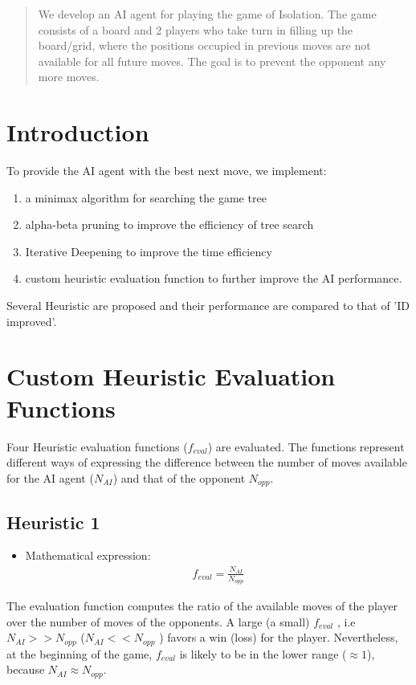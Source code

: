 \documentclass[12pt]{article}
\begin{document}
\maketitle

\begin{abstract}

We develop an AI agent for playing the game of Isolation. The game consists of a board and 2 players who take turn in filling up the board/grid, where the positions occupied in previous moves are not available for all future moves. The goal is to prevent the opponent any more moves.

\end{abstract}

\section{Introduction}
To provide the AI agent with the best next move, we implement:
\begin{enumerate}
\item a minimax algorithm for searching the game tree
\item alpha-beta pruning to improve the efficiency of tree search
\item Iterative Deepening to improve the time efficiency
\item custom heuristic evaluation function to further improve the AI performance.
\end{enumerate}
Several Heuristic are proposed and their performance are compared to that of 'ID improved'.

\section{Custom Heuristic Evaluation Functions}
Four Heuristic evaluation functions ($f_{eval}$) are evaluated. The functions represent different ways of expressing the difference between the number of moves available for the AI agent ($N_{AI}$) and that of the opponent $N_{opp}$. 

\subsection{Heuristic 1}

\begin{itemize}
\item Mathematical expression:
\begin{align}
f_{eval} = \frac{N_{AI}}{N_{opp}}
\end{align}
\end{itemize}
The evaluation function computes the ratio of the available moves of the player over the number of moves of the opponents. A large (a small) $f_{eval}$ , i.e $N_{AI} >> N_{opp}$  ($N_{AI} << N_{opp}$ ) favors a win (loss) for the player. Nevertheless, at the beginning of the game, $f_{eval}$ is likely to be in the lower range ($\approx 1$), because $N_{AI} \approx N_{opp}$.
\end{document}
